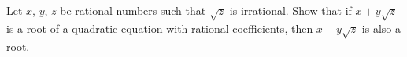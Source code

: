 Let $x$, $y$, $z$ be rational numbers such that $\sqrt z$ is irrational. Show that if $x+y\sqrt z$ is a root of a quadratic equation with rational coefficients, then $x-y\sqrt z$ is also a root.
